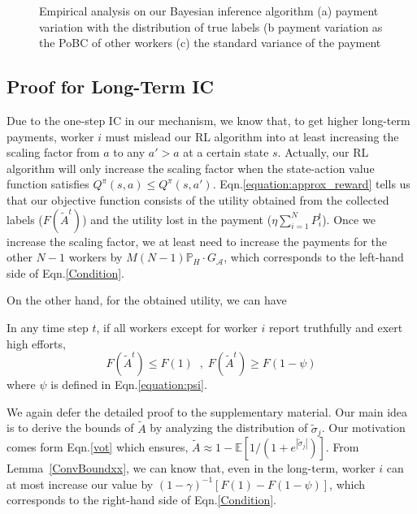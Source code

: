 \begin{figure}[!htb]
\begin{subfigure}[t]{0.32\textwidth}
        \caption{\label{BIM4}}
    \end{subfigure}
	\vspace{-3mm}
    \caption{\label{BIM}Empirical analysis on our Bayesian inference algorithm (a) payment variation with the distribution of true labels (b payment variation as the PoBC of other workers (c) the standard variance of the payment}
\vspace{-3mm}
\end{figure}
\subsection{Proof for Long-Term IC}
Due to the one-step IC in our mechanism, we know that, to get higher long-term payments, worker $i$ must mislead our RL algorithm into at least increasing the scaling factor from $a$ to any $a'>a$ at a certain state $s$.
Actually, our RL algorithm will only increase the scaling factor when the state-action value function satisfies $Q^{\pi}(s,a)\leq Q^{\pi}(s,a')$.
Eqn.\ref{equation:approx_reward} tells us that our objective function consists of the utility obtained from the collected labels ($F(\tilde{A}^t)$) and the utility lost in the payment ($\eta {\sum}_{i=1}^{N}P^t_i$).
Once we increase the scaling factor, we at least need to increase the payments for the other $N-1$ workers by $M(N-1)\mathbb{P}_H\cdot G_{\mathcal{A}}$, which corresponds to the left-hand side of Eqn.\ref{Condition}.

On the other hand, for the obtained utility, we can have 
\begin{lemma}
\label{ConvBoundxx}
In any time step $t$, if all workers except for worker $i$ report truthfully and exert high efforts,
\begin{equation*}
F(\tilde{A}^t)\leq F(1) \;\;,\; F(\tilde{A}^t)\geq F(1-\psi)
\end{equation*}
where $\psi$ is defined in Eqn.\ref{equation:psi}.
\end{lemma}
We again defer the detailed proof to the supplementary material.
Our main idea is to derive the bounds of $\tilde{A}$ by analyzing the distribution of $\tilde{\sigma}_j$.
Our motivation comes form Eqn.\ref{vot} which ensures, $\tilde{A} \approx 1-\mathbb{E}[1/(1+e^{|\tilde{\sigma}_j|})]$. From Lemma~\ref{ConvBoundxx}, we can know that, even in the long-term, worker $i$ can at most increase our value by $(1-\gamma)^{-1}[F(1)-F(1-\psi)]$, which corresponds to the right-hand side of Eqn.\ref{Condition}.

